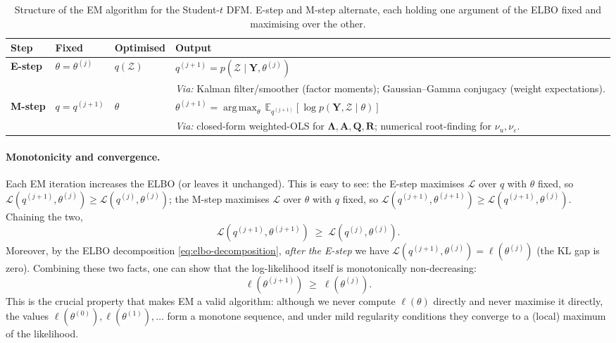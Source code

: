\documentclass[11pt, a4paper, oneside]{article}
\DeclareMathOperator*{\argmax}{arg\,max}
\newcommand{\mY}{\mathbf{Y}}
\newcommand{\mL}{\boldsymbol{\Lambda}}
\newcommand{\mA}{\mathbf{A}}
\newcommand{\mR}{\mathbf{R}}
\newcommand{\mQ}{\mathbf{Q}}
\begin{document}
\begin{table}[h!]
\centering
\small
\renewcommand{\arraystretch}{1.1}
\begin{tabular}{@{}p{1.5cm} p{2.7cm} p{2.2cm} p{8cm}@{}}
\toprule
\textbf{Step} & \textbf{Fixed} & \textbf{Optimised} & \textbf{Output} \\
\midrule
\textbf{E-step}
  & $\theta = \theta^{(j)}$
  & $q(\mathcal{Z})$
  & $q^{(j+1)} = p(\mathcal{Z} \mid \mY, \theta^{(j)})$ \\
  & & & \emph{Via:} Kalman filter/smoother (factor moments); Gaussian–Gamma conjugacy (weight expectations). \\
\addlinespace[2pt]
\textbf{M-step}
  & $q = q^{(j+1)}$
  & $\theta$
  & $\theta^{(j+1)} = \argmax_\theta\, \mathbb{E}_{q^{(j+1)}}[\log p(\mY, \mathcal{Z} \mid \theta)]$ \\
  & & & \emph{Via:} closed-form weighted-OLS for $\mL, \mA, \mQ, \mR$; numerical root-finding for $\nu_u, \nu_\varepsilon$. \\
\bottomrule
\end{tabular}
\caption{Structure of the EM algorithm for the Student-$t$ DFM.
E-step and M-step alternate, each holding one argument of the ELBO
fixed and maximising over the other.}
\label{tab:em-summary}
\end{table}

\bigskip


\paragraph{Monotonicity and convergence.}
Each EM iteration increases the ELBO (or leaves it unchanged). This is
easy to see: the E-step maximises $\mathcal{L}$ over $q$ with $\theta$
fixed, so $\mathcal{L}(q^{(j+1)}, \theta^{(j)}) \geq
\mathcal{L}(q^{(j)}, \theta^{(j)})$; the M-step maximises $\mathcal{L}$
over $\theta$ with $q$ fixed, so $\mathcal{L}(q^{(j+1)}, \theta^{(j+1)})
\geq \mathcal{L}(q^{(j+1)}, \theta^{(j)})$. Chaining the two,
\[
\mathcal{L}(q^{(j+1)}, \theta^{(j+1)}) \;\geq\; \mathcal{L}(q^{(j)}, \theta^{(j)}).
\]
Moreover, by the ELBO decomposition \eqref{eq:elbo-decomposition},
\emph{after the E-step} we have $\mathcal{L}(q^{(j+1)}, \theta^{(j)}) =
\ell(\theta^{(j)})$ (the KL gap is zero). Combining these two facts, one
can show that the log-likelihood itself is monotonically
non-decreasing:
\[
\ell(\theta^{(j+1)}) \;\geq\; \ell(\theta^{(j)}).
\]
This is the crucial property that makes EM a valid algorithm: although
we never compute $\ell(\theta)$ directly and never maximise it directly,
the values $\ell(\theta^{(0)}), \ell(\theta^{(1)}), \ldots$ form a
monotone sequence, and under mild regularity conditions they converge
to a (local) maximum of the likelihood.
\end{document}
